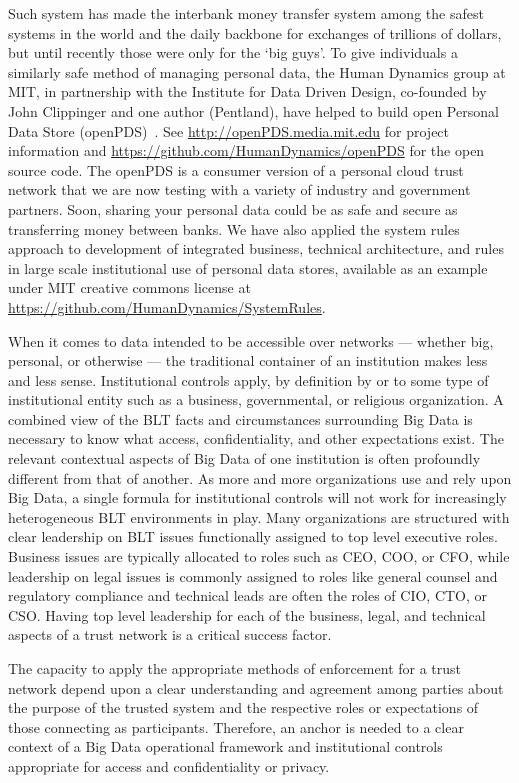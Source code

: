 Such system has made the interbank money transfer system among the safest systems in the world and the daily backbone for exchanges of trillions of dollars, but until recently those were only for the `big guys'.
To give individuals a similarly safe method of managing personal data, the Human Dynamics group at MIT, in partnership with the Institute for Data Driven Design, co-founded by John Clippinger and one author (Pentland), have helped to build open Personal Data Store (openPDS)~\cite{de2012trusted}. See \url{http://openPDS.media.mit.edu} for project information and \url{https://github.com/HumanDynamics/openPDS} for the open source code.
The openPDS is a consumer version of a personal cloud trust network that we are now testing with a variety of industry and government partners.
Soon, sharing your personal data could be as safe and secure as transferring money between banks.
We have also applied the system rules approach to development of integrated business, technical architecture, and rules in large scale institutional use of personal data stores, available as an example under MIT creative commons license at \url{https://github.com/HumanDynamics/SystemRules}. 

When it comes to data intended to be accessible over networks --- whether big, personal, or otherwise --- the traditional container of an institution makes less and less sense.
Institutional controls apply, by definition by or to some type of institutional entity such as a business, governmental, or religious organization.
A combined view of the BLT facts and circumstances surrounding Big Data is necessary to know what access, confidentiality, and other expectations exist.
The relevant contextual aspects of Big Data of one institution is often profoundly different from that of another.
As more and more organizations use and rely upon Big Data, a single formula for institutional controls will not work for increasingly heterogeneous BLT environments in play.
Many organizations are structured with clear leadership on BLT issues functionally assigned to top level executive roles. 
Business issues are typically allocated to roles such as CEO, COO, or CFO, while leadership on legal issues is commonly assigned to roles like general counsel and regulatory compliance and technical leads are often the roles of CIO, CTO, or CSO.
Having top level leadership for each of the business, legal, and technical aspects of a trust network is a critical success factor.

The capacity to apply the appropriate methods of enforcement for a trust network depend upon a clear understanding and agreement among parties about the purpose of the trusted system and the respective roles or expectations of those connecting as participants.
Therefore, an anchor is needed to a clear context of a Big Data operational framework and institutional controls appropriate for access and confidentiality or privacy.

